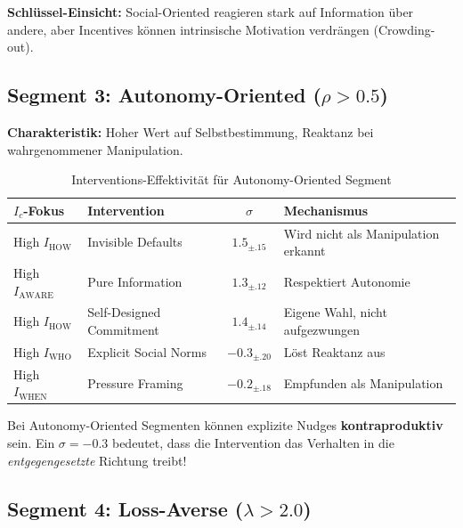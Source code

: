 \textbf{Schlüssel-Einsicht:} Social-Oriented reagieren stark auf Information über andere, aber Incentives können intrinsische Motivation verdrängen (Crowding-out).

\subsection{Segment 3: Autonomy-Oriented ($\rho > 0.5$)}

\textbf{Charakteristik:} Hoher Wert auf Selbstbestimmung, Reaktanz bei wahrgenommener Manipulation.

\begin{table}[htbp]
\centering
\caption{Interventions-Effektivität für Autonomy-Oriented Segment}
\label{tab:19-autonomy-oriented}
\renewcommand{\arraystretch}{1.3}
\small
\begin{tabular}{@{}llcp{5cm}@{}}
\toprule
\textbf{$I_c$-Fokus} & \textbf{Intervention} & \textbf{$\sigma$} & \textbf{Mechanismus} \\
\midrule
High $I_{\text{HOW}}$ & Invisible Defaults & \cellcolor{green!25}$1.5_{\pm.15}$ & Wird nicht als Manipulation erkannt \\
High $I_{\text{AWARE}}$ & Pure Information & $1.3_{\pm.12}$ & Respektiert Autonomie \\
High $I_{\text{HOW}}$ & Self-Designed Commitment & $1.4_{\pm.14}$ & Eigene Wahl, nicht aufgezwungen \\
High $I_{\text{WHO}}$ & Explicit Social Norms & \cellcolor{red!25}$-0.3_{\pm.20}$ & L\"{o}st Reaktanz aus \\
High $I_{\text{WHEN}}$ & Pressure Framing & \cellcolor{red!25}$-0.2_{\pm.18}$ & Empfunden als Manipulation \\
\bottomrule
\end{tabular}
\end{table}

\begin{tcolorbox}[colback=red!10!white, colframe=red!75!black,
    title=\textbf{Warnung: Reaktanz-Risiko}]
Bei Autonomy-Oriented Segmenten können explizite Nudges \textbf{kontraproduktiv} sein. Ein $\sigma = -0.3$ bedeutet, dass die Intervention das Verhalten in die \textit{entgegengesetzte} Richtung treibt!
\end{tcolorbox}

\subsection{Segment 4: Loss-Averse ($\lambda > 2.0$)}


